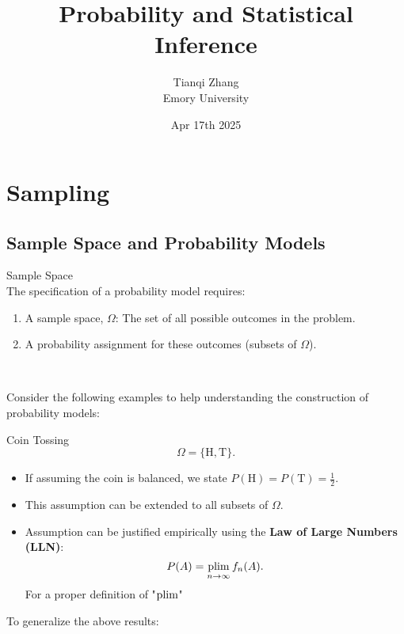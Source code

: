 

\title{\textbf{%
               Probability and Statistical Inference}}
\author{Tianqi Zhang\\
Emory University}
\date{Apr 17th 2025}



\newpage
\maketitle
\setcounter{tocdepth}{1} %

\setcounter{section}{1}
\section{Sampling}
\subsection{Sample Space and Probability Models}
\begin{df}{Sample Space}\\
The specification of a probability model requires:
\begin{enumerate}
	\item A sample space, \(\Omega\): The set of all possible outcomes in the problem.
	\item A probability assignment for these outcomes (subsets of $\Omega$).
\end{enumerate}
\
\end{df}
Consider the following examples to help understanding the construction of probability models: 
\begin{eg}{Coin Tossing}
\[
\Omega = \{\text{H}, \text{T}\}.
\]
\begin{itemize}
    \item If assuming the coin is balanced, we state \(P(\text{H}) = P(\text{T}) = \frac{1}{2}\).
    \item This assumption can be extended to all subsets of \(\Omega\).
    \item Assumption can be justified empirically using the \textbf{Law of Large Numbers (LLN)}:  
    \[
    P(A) = \operatorname*{plim}_{n \to \infty} f_n(A).
    \]
    For a proper definition of "$\operatorname*{plim}$"
\end{itemize}
\end{eg}

To generalize the above results: \\

